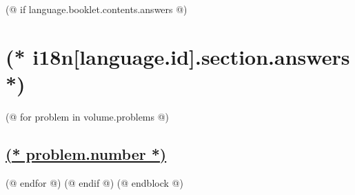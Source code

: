     (@ if language.booklet.contents.answers @)
        \section{(* i18n[language.id].section.answers *)}
        \pagestyle{answers}
        (@ for problem in volume.problems @)%
            \setcounter{problem}{(* problem.number *)}%
            \hypersetup{linkcolor=black}%
            \subsection{%
                \texorpdfstring{%
                    \hyperref[ssc:(* problem.id *)-solution]{(* problem.number *)}%
                }{%
                    (* problem.number *). (* problem.id *)%
                }%
            }%
            \label{ssc:(* problem.id*)-answer}%
            \hypersetup{linkcolor=colour-link}%
        (@ endfor @)
    (@ endif @)
(@ endblock @)
